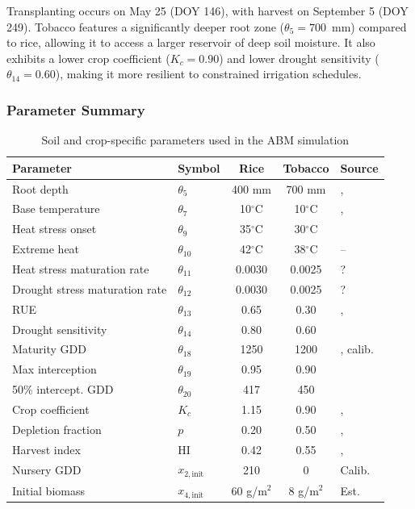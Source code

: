 Transplanting occurs on May 25 (DOY 146), with harvest on September 5 (DOY 249). Tobacco features a significantly deeper root zone ($\theta_5 = 700$~mm) compared to rice, allowing it to access a larger reservoir of deep soil moisture. It also exhibits a lower crop coefficient ($K_c = 0.90$) and lower drought sensitivity ($\theta_{14} = 0.60$), making it more resilient to constrained irrigation schedules. 

\subsubsection{Parameter Summary}

\begin{table}[H]
\centering
\caption{Soil and crop-specific parameters used in the ABM simulation}
\label{tab:params}
\small
\begin{tabular}{llccl}
\toprule
\textbf{Parameter} & \textbf{Symbol} & \textbf{Rice} & \textbf{Tobacco} & \textbf{Source} \\
\midrule
Root depth & $\theta_5$ & 400 mm & 700 mm & \cite{allen1998}, \cite{fao_tobacco} \\
Base temperature & $\theta_7$ & 10$^{\circ}$C & 10$^{\circ}$C & \cite{laohasiriwong2023}, \cite{li2021} \\
Heat stress onset & $\theta_9$ & 35$^{\circ}$C & 30$^{\circ}$C & \cite{fao_tobacco} \\
Extreme heat & $\theta_{10}$ & 42$^{\circ}$C & 38$^{\circ}$C & -- \\
Heat stress maturation rate & $\theta_{11}$ & 0.0030 & 0.0025 & ? \\
Drought stress maturation rate & $\theta_{12}$ & 0.0030 & 0.0025 & ? \\
RUE & $\theta_{13}$ & 0.65 & 0.30 & \cite{patel2013}, \cite{ferrara2002} \\
Drought sensitivity & $\theta_{14}$ & 0.80 & 0.60 & \cite{Lopezjimenez2024} \\
Maturity GDD & $\theta_{18}$ & 1250 & 1200 & \cite{sadidi2021}, calib. \\
Max interception & $\theta_{19}$ & 0.95 & 0.90 & \cite{Lopezjimenez2024} \\
50\% intercept. GDD & $\theta_{20}$ & 417 & 450 & \cite{zhang2017} \\
Crop coefficient & $K_c$ & 1.15 & 0.90 & \cite{allen1998}, \cite{fao_tobacco} \\
Depletion fraction & $p$ & 0.20 & 0.50 & \cite{allen1998}, \cite{fao_tobacco} \\
Harvest index & HI & 0.42 & 0.55 & \cite{jalali2021}, \cite{fao_tobacco} \\
Nursery GDD & $x_{2,\text{init}}$ & 210 & 0 & Calib. \\
Initial biomass & $x_{4,\text{init}}$ & 60 g/m$^2$ & 8 g/m$^2$ & Est. \\
\bottomrule
\end{tabular}
\end{table}